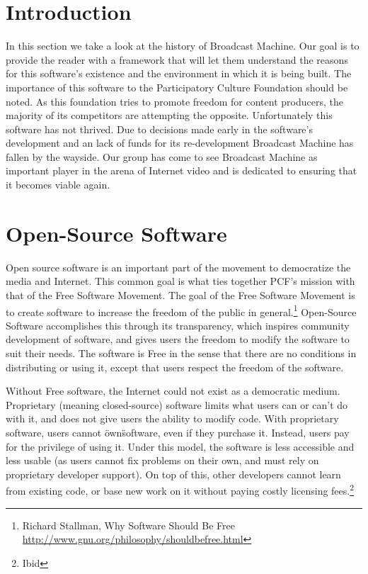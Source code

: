 \documentclass[a4paper,12pt]{report}
\begin{document}
\section{Introduction}
In this section we take a look at the history of Broadcast Machine.
Our goal is to provide the reader with a framework that will let them understand the reasons for this software's existence and the environment in which it is being built.
The importance of this software to the Participatory Culture Foundation should be noted.
As this foundation tries to promote freedom for content producers, the majority of its competitors are attempting the opposite.
Unfortunately this software has not thrived.
Due to decisions made early in the software's development and an lack of funds for its re-development Broadcast Machine has fallen by the wayside.
Our group has come to see Broadcast Machine as important player in the arena of Internet video and is dedicated to ensuring that it 
becomes viable again.

\section{Open-Source Software}
Open source software is an important part of the movement to democratize the media and Internet. 
This common goal is what ties together PCF's mission with that of the Free Software Movement. 
The goal of the Free Software Movement is to create software to increase the freedom of the public in general.\footnote{Richard Stallman, Why Software Should Be Free \url{http://www.gnu.org/philosophy/shouldbefree.html}}
Open-Source Software accomplishes this through its transparency, which inspires community development of software, and gives users the freedom to modify the software to suit their needs.
The software is Free in the sense that there are no conditions in distributing or using it, except that users respect the freedom of the software.

Without Free software, the Internet could not exist as a democratic medium.
Proprietary (meaning closed-source) software limits what users can or can't do with it, and does not give users the ability to modify code.
With proprietary software, users cannot \"own\" software, even if they purchase it.
Instead, users pay for the privilege of using it.
Under this model, the software is less accessible and less usable (as users cannot fix problems on their own, and must rely on proprietary developer support).
On top of this, other developers cannot learn from existing code, or base new work on it without paying costly licensing fees.\footnote{Ibid} 
\end{document}
